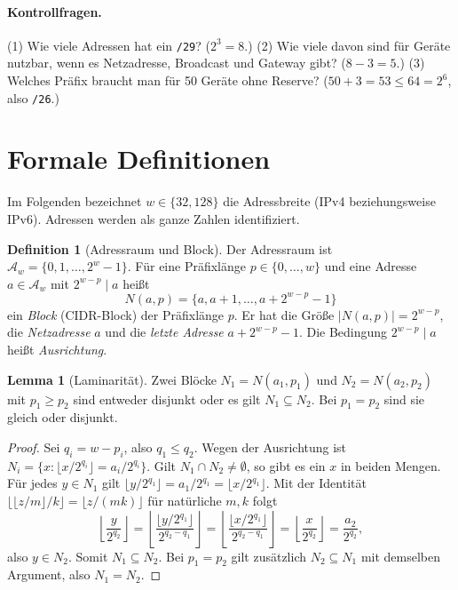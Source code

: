 \documentclass[a4paper,12pt, twoside]{report}
\theoremstyle{definition}
\newtheorem{definition}{Definition}
\newtheorem{lemma}{Lemma}
\begin{document}
\paragraph{Kontrollfragen.} (1) Wie viele Adressen hat ein \texttt{/29}? ($2^3 = 8$.) (2) Wie viele davon sind für Geräte nutzbar, wenn es Netzadresse, Broadcast und Gateway gibt? ($8-3=5$.) (3) Welches Präfix braucht man für 50 Geräte ohne Reserve? ($50+3 = 53 \le 64 = 2^6$, also \texttt{/26}.)

\section{Formale Definitionen}
\label{sec:formal}

Im Folgenden bezeichnet $w \in \{32, 128\}$ die Adressbreite (IPv4 beziehungsweise IPv6). Adressen werden als ganze Zahlen identifiziert.

\begin{definition}[Adressraum und Block]
\label{def:block}
	Der Adressraum ist $\mathcal{A}_w = \{0, 1, \ldots, 2^w - 1\}$. Für eine Präfixlänge $p \in \{0,\ldots,w\}$ und eine Adresse $a \in \mathcal{A}_w$ mit $2^{w-p} \mid a$ heißt
	\[
	N(a,p) = \{a, a+1, \ldots, a + 2^{w-p} - 1\}
	\]
	ein \emph{Block} (CIDR-Block) der Präfixlänge $p$. Er hat die Größe $|N(a,p)| = 2^{w-p}$, die \emph{Netzadresse} $a$ und die \emph{letzte Adresse} $a + 2^{w-p} - 1$. Die Bedingung $2^{w-p} \mid a$ heißt \emph{Ausrichtung}.
\end{definition}

\begin{lemma}[Laminarität]
\label{lem:laminar}
	Zwei Blöcke $N_1 = N(a_1,p_1)$ und $N_2 = N(a_2,p_2)$ mit $p_1 \ge p_2$ sind entweder disjunkt oder es gilt $N_1 \subseteq N_2$. Bei $p_1 = p_2$ sind sie gleich oder disjunkt.
\end{lemma}

\begin{proof}
	Sei $q_i = w - p_i$, also $q_1 \le q_2$. Wegen der Ausrichtung ist $N_i = \{x : \lfloor x / 2^{q_i} \rfloor = a_i / 2^{q_i}\}$. Gilt $N_1 \cap N_2 \neq \emptyset$, so gibt es ein $x$ in beiden Mengen. Für jedes $y \in N_1$ gilt $\lfloor y/2^{q_1}\rfloor = a_1/2^{q_1} = \lfloor x/2^{q_1}\rfloor$. Mit der Identität $\lfloor \lfloor z/m \rfloor / k \rfloor = \lfloor z/(mk) \rfloor$ für natürliche $m,k$ folgt
	\[
	\left\lfloor \frac{y}{2^{q_2}} \right\rfloor = \left\lfloor \frac{\lfloor y/2^{q_1}\rfloor}{2^{q_2-q_1}} \right\rfloor = \left\lfloor \frac{\lfloor x/2^{q_1}\rfloor}{2^{q_2-q_1}} \right\rfloor = \left\lfloor \frac{x}{2^{q_2}} \right\rfloor = \frac{a_2}{2^{q_2}},
	\]
	also $y \in N_2$. Somit $N_1 \subseteq N_2$. Bei $p_1 = p_2$ gilt zusätzlich $N_2 \subseteq N_1$ mit demselben Argument, also $N_1 = N_2$.
\end{proof}
\end{document}
